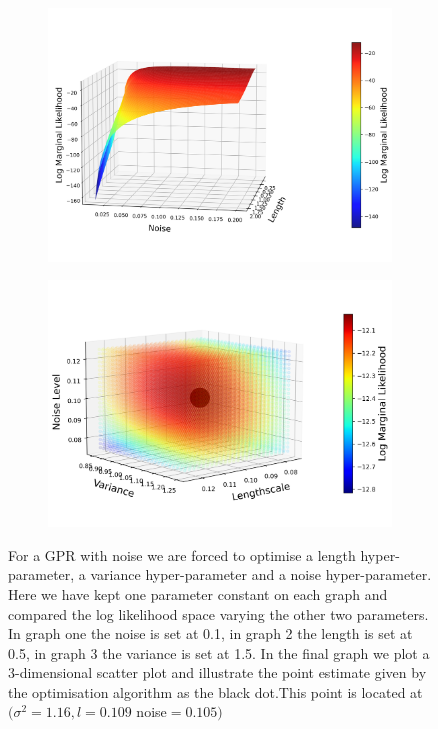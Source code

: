 \documentclass[11pt]{article}
\begin{document}
\begin{figure}[H]
    \begin{subfigure}[b]{0.4\textwidth}
        \centering
        \includegraphics[width=\textwidth]{LatexPlots/1dplots/lengthvsnoise.png}
    \end{subfigure}
    \hspace{0.05\textwidth}
    \begin{subfigure}[b]{0.4\textwidth}
        \centering
        \includegraphics[width=\textwidth]{LatexPlots/1dplots/LogLike3params.png}
    \end{subfigure}
    \caption{For a GPR with noise we are forced to optimise a length hyper-parameter, a variance hyper-parameter and a noise hyper-parameter. 
    Here we have kept one parameter constant on each graph and compared the log likelihood space varying the other two parameters. 
    In graph one the noise is set at 0.1, in graph 2 the length is set at 0.5, in graph 3 the variance is set at 1.5. 
    In the final graph we plot a 3-dimensional scatter plot and illustrate the point estimate given by the optimisation algorithm as the black dot.This point is located at
    $(\sigma^2 = 1.16, l = 0.109$ noise$ = 0.105)$}
   \label{figure: Optimising Hyper-params}
\end{figure} 
\end{document}
